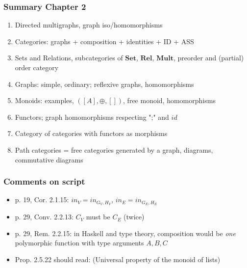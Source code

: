\documentclass[handout]{beamer}
\newcommand{\bfsf}[1]{{\boldsymbol{#1}}}
\newcommand{\Set}{\bfsf{Set}}
\newcommand{\Rel}{\bfsf{Rel}}
\newcommand{\Mult}{\bfsf{Mult}}
\begin{document}
\frame
  {   
    \frametitle{Summary Chapter 2}\label{Ch2:Summary}

 \begin{enumerate}[<+->]
\item Directed multigraphs, graph iso/homomorphisms
\item Categories: graphs + composition + identities + ID + ASS
\item Sets and Relations, subcategories of $\Set$, $\Rel$, $\Mult$, preorder
and (partial) order category
\item Graphs: simple, ordinary; reflexive graphs, homomorphisms
\item Monoids: examples, $([A],\oplus,[])$, free monoid, homomorphisms
\item Functors; graph homomorphisms respecting ";" and $id$
\item Category of categories with functors as morphisms
\item Path categories = free categories generated by a graph, diagrams,
commutative diagrams
 \end{enumerate}


}

\frame
  {   
    \frametitle{Comments on script}\label{Ch2:comments}

 \begin{itemize}[<+->]
\item p. 19, Cor. 2.1.15: $in_V = in_{G_V,H_V}$, $in_E = in_{G_E,H_E}$
\item p. 29, Conv. 2.2.13: $C_V$ must be $C_E$ (twice)
\item p. 29, Rem. 2.2.15: in Haskell and type theory, composition would be
\emph{one} polymorphic function with type arguments $A,B,C$
\item Prop. 2.5.22 should read: (Universal property of the monoid of lists) 
 \end{itemize}

 }
\end{document}
